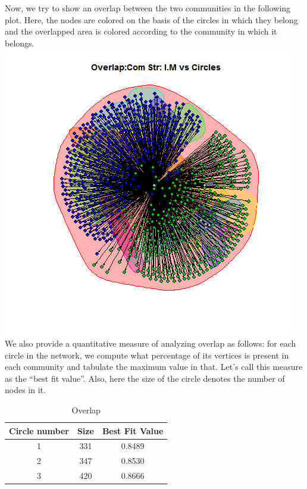 \documentclass{article}
\begin{document}
\begin{enumerate}
 Now, we try to show an overlap between the two communities in the following plot.
Here, the nodes are colored on the basis of the circles in which they belong and 
the overlapped area is colored according to the community in which it belongs.\\
 \includegraphics[scale=0.7]{7e} \\
 
 We also provide a quantitative measure of analyzing overlap as follows: for each circle in the network,
 we compute what percentage of its vertices is present in each community and tabulate the maximum value in that.
 Let's call this measure as the ``best fit value''. Also, here the size of the circle denotes the number of nodes in it.
\begin{table}[ht]
\caption{Overlap}
\centering
\begin{tabular}{| c | c | c |}
\hline\hline
\newline

Circle number & Size & Best Fit Value \\ [0.5ex]
\hline

1 & 331 & 0.8489 \\
\hline
2 & 347 & 0.8530 \\
\hline
3 & 420 & 0.8666 \\
\hline
\end{tabular}
\end{table} 


\end{enumerate}
\end{document}
